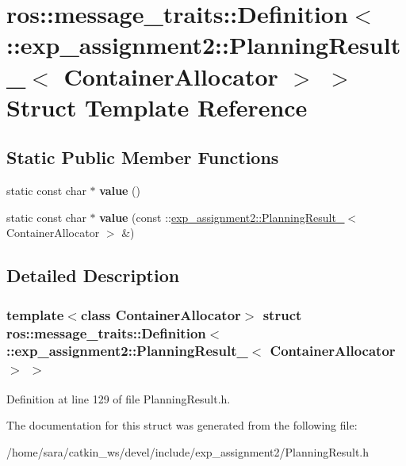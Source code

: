\hypertarget{structros_1_1message__traits_1_1Definition_3_01_1_1exp__assignment2_1_1PlanningResult___3_01ContainerAllocator_01_4_01_4}{}\section{ros\+:\+:message\+\_\+traits\+:\+:Definition$<$ \+:\+:exp\+\_\+assignment2\+:\+:Planning\+Result\+\_\+$<$ Container\+Allocator $>$ $>$ Struct Template Reference}
\label{structros_1_1message__traits_1_1Definition_3_01_1_1exp__assignment2_1_1PlanningResult___3_01ContainerAllocator_01_4_01_4}
\subsection*{Static Public Member Functions}
\begin{DoxyCompactItemize}
\item 
\mbox{\label{structros_1_1message__traits_1_1Definition_3_01_1_1exp__assignment2_1_1PlanningResult___3_01ContainerAllocator_01_4_01_4_a597021d3b30ba12975bb4c9ce2c7b111}} 
static const char $\ast$ {\bfseries value} ()
\item 
\mbox{\label{structros_1_1message__traits_1_1Definition_3_01_1_1exp__assignment2_1_1PlanningResult___3_01ContainerAllocator_01_4_01_4_a3180b619f35bf09bfb066c8c08c783da}} 
static const char $\ast$ {\bfseries value} (const \+::\hyperlink{structexp__assignment2_1_1PlanningResult__}{exp\+\_\+assignment2\+::\+Planning\+Result\+\_\+}$<$ Container\+Allocator $>$ \&)
\end{DoxyCompactItemize}


\subsection{Detailed Description}
\subsubsection*{template$<$class Container\+Allocator$>$\newline
struct ros\+::message\+\_\+traits\+::\+Definition$<$ \+::exp\+\_\+assignment2\+::\+Planning\+Result\+\_\+$<$ Container\+Allocator $>$ $>$}



Definition at line 129 of file Planning\+Result.\+h.



The documentation for this struct was generated from the following file\+:\begin{DoxyCompactItemize}
\item 
/home/sara/catkin\+\_\+ws/devel/include/exp\+\_\+assignment2/Planning\+Result.\+h\end{DoxyCompactItemize}

